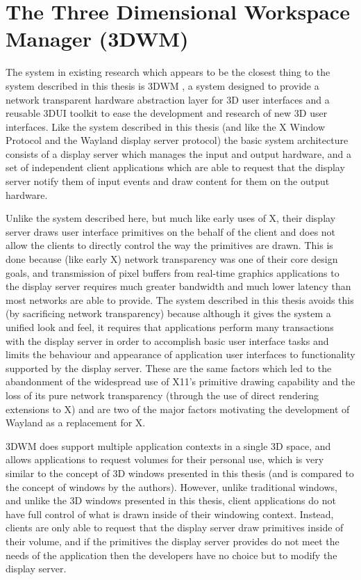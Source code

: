 \section{The Three Dimensional Workspace Manager (3DWM)}

The system in existing research which appears to be the closest thing to the system described in this thesis is 3DWM \cite{3dwm}, a system designed to provide a network transparent hardware abstraction layer for 3D user interfaces and a reusable 3DUI toolkit to ease the development and research of new 3D user interfaces. Like the system described in this thesis (and like the X Window Protocol and the Wayland display server protocol) the basic system architecture consists of a display server which manages the input and output hardware, and a set of independent client applications which are able to request that the display server notify them of input events and draw content for them on the output hardware. 

Unlike the system described here, but much like early uses of X, their display server draws user interface primitives on the behalf of the client and does not allow the clients to directly control the way the primitives are drawn. This is done because (like early X) network transparency was one of their core design goals, and transmission of pixel buffers from real-time graphics applications to the display server requires much greater bandwidth and much lower latency than most networks are able to provide. The system described in this thesis avoids this (by sacrificing network transparency) because although it gives the system a unified look and feel, it requires that applications perform many transactions with the display server in order to accomplish basic user interface tasks and limits the behaviour and appearance of application user interfaces to functionality supported by the display server. These are the same factors which led to the abandonment of the widespread use of X11's primitive drawing capability and the loss of its pure network transparency (through the use of direct rendering extensions to X) and are two of the major factors motivating the development of Wayland as a replacement for X. 

3DWM does support multiple application contexts in a single 3D space, and allows applications to request volumes for their personal use, which is very similar to the concept of 3D windows presented in this thesis (and is compared to the concept of windows by the authors). However, unlike traditional windows, and unlike the 3D windows presented in this thesis, client applications do not have full control of what is drawn inside of their windowing context. Instead, clients are only able to request that the display server draw primitives inside of their volume, and if the primitives the display server provides do not meet the needs of the application then the developers have no choice but to modify the display server.

